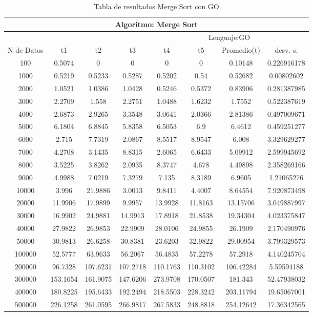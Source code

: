 \documentclass{article}
\begin{document}
        \begin{table}[]
        \begin{tabular}{|c|c|c|c|c|c|c|c| }
            \hline
            \multicolumn{8}{|c|}{Algoritmo: Merge Sort} \\ \hline
            \multicolumn{4}{|c|}{} & \multicolumn{4}{c|}{Lenguaje:GO} \\ \hline
              N de Datos &     t1    &  t2         &  t3          &   t4        &    t5     &   Promedio(t)       & desv. s. \\ \hline
            100&	0.5074&	0	&0	&0	&0	&0.10148	&0.226916178\\ \hline
1000&	0.5219	&0.5233	&0.5287	&0.5202	&0.54	&0.52682	&0.00802602\\ \hline
2000	&1.0521	&1.0386	&1.0428	&0.5246	&0.5372	&0.83906	&0.281387985\\ \hline
3000	&2.2709	&1.558	&2.2751	&1.0488	&1.6232	&1.7552	&0.522387619\\ \hline
4000	&2.6873	&2.9265	&3.3548	&3.0641	&2.0366	&2.81386	&0.497009671\\ \hline
5000	&6.1804	&6.8845	&5.8358	&6.5053	&6.9	  & 6.4612	&0.459251277\\ \hline
6000	&2.715	&7.7319	&2.0867	&8.5517	&8.9547	&6.008	&3.329629277\\ \hline
7000	&4.2708	&3.1435	&8.8315	&2.6065	&6.6433&	5.09912	&2.599945692\\ \hline
8000	&3.5225	&3.8262	&2.0935	&8.3747	&4.678	&4.49898	&2.358269166\\ \hline
9000	&4.9988	&7.0219	&7.3279	&7.135	&8.3189&	6.9605	&1.21065276\\ \hline
10000	&3.996	&21.9886	&3.0013	&9.8411	&4.4007	&8.64554	&7.920873498\\ \hline
20000	&11.9906	&17.9899	&9.9957	&13.9928	&11.8163	&13.15706	&3.049887997\\ \hline
30000	&16.9902	&24.9881	&14.9913	&17.8918	&21.8538	&19.34304	&4.023375847\\ \hline
40000	&27.9822	&26.9853	&22.9909	&28.0106	&24.9855	&26.1909	  &2.170490976\\ \hline
50000	&30.9813	&26.6258	&30.8381	&23.6203	&32.9822&	29.00954	&3.799329573\\ \hline
100000	&52.5777	&63.9633	&56.2067	&56.4835	&57.2278	&57.2918&	4.140245704\\ \hline
200000&	96.7328	  &   107.6231	&107.2718	&110.1763	&110.3102	&106.42284	&5.59594188\\ \hline
300000	&153.1654	&161.9075	&147.6206	&273.9708	&170.0507	&181.343	    &52.47938032\\ \hline
400000&	180.8225&	195.6433	&192.2494	&218.5503	&228.3242	&203.11794	&19.65067001\\ \hline
500000	&226.1258&	261.0595	&266.9817	&267.5833	&248.8818	&254.12642	&17.36342565\\ \hline

                \end{tabular}
                   \caption{Tabla de resultados Merge Sort con GO}
        \label{tab:mergeSortGO}
    \end{table}
\end{document}
